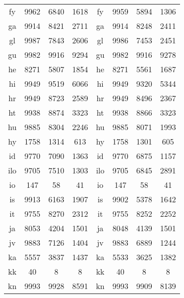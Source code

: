 \begin{figure}[h]
\begin{tabular}{cccc|cccc}
fy&9962&6840&1618&	fy&9959&5894&1306\\
ga&9914&8421&2711&	ga&9914&8248&2411\\
gl&9987&7843&2606&	gl&9986&7453&2451\\
gu&9982&9916&9294&	gu&9982&9916&9278\\
he&8271&5807&1854&	he&8271&5561&1687\\
hi&9949&9519&6066&	hi&9949&9320&5344\\
hr&9949&8723&2589&	hr&9949&8496&2367\\
ht&9938&8874&3323&	ht&9938&8866&3323\\
hu&9885&8304&2246&	hu&9885&8071&1993\\
hy&1758&1314&613&	hy&1758&1301&605\\
id&9770&7090&1363&	id&9770&6875&1157\\
ilo&9705&7510&1303&	ilo&9705&6845&2891\\
io&147&58&41&	io&147&58&41\\
is&9913&6163&1907&	is&9902&5378&1642\\
it&9755&8270&2312&	it&9755&8252&2252\\
ja&8053&4204&1501&	ja&8048&4139&1501\\
jv&9883&7126&1404&	jv&9883&6889&1244\\
ka&5557&3837&1437&	ka&5533&3625&1382\\
kk&40&8&8&	kk&40&8&8\\
kn&9993&9928&8591&	kn&9993&9909&8139\\
\end{tabular}
\end{figure}
\clearpage
